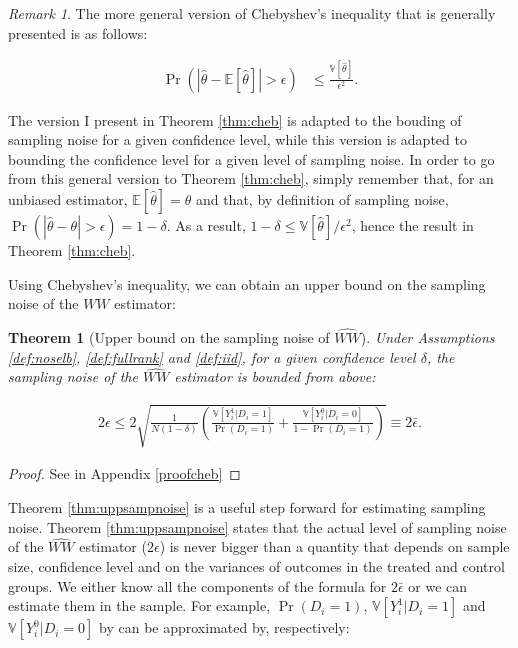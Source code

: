 \documentclass[
]{book}
\newcommand{\esp}[1]{\mathbb{E}[ #1 ]}
\newcommand{\var}[1]{\mathbb{V}[ #1 ]}
\newtheorem{theorem}{Theorem}[chapter]
\theoremstyle{definition}
\theoremstyle{definition}
\theoremstyle{definition}
\theoremstyle{definition}
\theoremstyle{remark}
\newtheorem*{remark}{Remark}
\begin{document}
\begin{remark}
\iffalse{} {Remark. } \fi{}The more general version of Chebyshev's inequality that is generally presented is as follows:

\begin{align*}
\Pr(|\hat{\theta}-\esp{\hat{\theta}}|>\epsilon) & \leq \frac{\var{\hat{\theta}}}{\epsilon^2}.
\end{align*}

The version I present in Theorem \ref{thm:cheb} is adapted to the bouding of sampling noise for a given confidence level, while this version is adapted to bounding the confidence level for a given level of sampling noise.
In order to go from this general version to Theorem \ref{thm:cheb}, simply remember that, for an unbiased estimator, \(\esp{\hat{\theta}}=\theta\) and that, by definition of sampling noise, \(\Pr(|\hat{\theta}-\theta|>\epsilon)=1-\delta\).
As a result, \(1-\delta\leq\var{\hat{\theta}}/\epsilon^2\), hence the result in Theorem \ref{thm:cheb}.
\end{remark}

Using Chebyshev's inequality, we can obtain an upper bound on the sampling noise of the \(WW\) estimator:

\begin{theorem}[Upper bound on the sampling noise of $\hat{WW}$]
\protect\hypertarget{thm:uppsampnoise}{}{\label{thm:uppsampnoise} \iffalse (Upper bound on the sampling noise of \(\hat{WW}\)) \fi{} }Under Assumptions \ref{def:noselb}, \ref{def:fullrank} and \ref{def:iid}, for a given confidence level \(\delta\), the sampling noise of the \(\hat{WW}\) estimator is bounded from above:

\begin{align*}
2\epsilon \leq 2\sqrt{\frac{1}{N(1-\delta)}\left(\frac{\var{Y_i^1|D_i=1}}{\Pr(D_i=1)}+\frac{\var{Y_i^0|D_i=0}}{1-\Pr(D_i=1)}\right)}\equiv 2\bar{\epsilon}.
\end{align*}
\end{theorem}

\begin{proof}
\iffalse{} {Proof. } \fi{}See in Appendix \ref{proofcheb}
\end{proof}

Theorem \ref{thm:uppsampnoise} is a useful step forward for estimating sampling noise.
Theorem \ref{thm:uppsampnoise} states that the actual level of sampling noise of the \(\hat{WW}\) estimator (\(2\epsilon\)) is never bigger than a quantity that depends on sample size, confidence level and on the variances of outcomes in the treated and control groups.
We either know all the components of the formula for \(2\bar{\epsilon}\) or we can estimate them in the sample.
For example, \(\Pr(D_i=1)\), \(\var{Y_i^1|D_i=1}\) and \(\var{Y_i^0|D_i=0}\) by can be approximated by, respectively:
\end{document}
